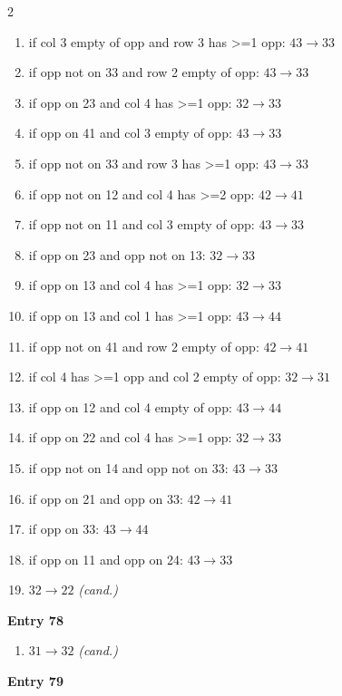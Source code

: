 \begin{multicols}{2}
\begin{tikzpicture}[scale=0.24]
\end{tikzpicture}
\nopagebreak\begin{enumerate}[topsep=1pt,itemsep=0pt,parsep=0pt,leftmargin=2.2em,label=\arabic*.]
\item if col 3 empty of opp and row 3 has >=1 opp: $43\!\to\!33$
\item if opp not on 33 and row 2 empty of opp: $43\!\to\!33$
\item if opp on 23 and col 4 has >=1 opp: $32\!\to\!33$
\item if opp on 41 and col 3 empty of opp: $43\!\to\!33$
\item if opp not on 33 and row 3 has >=1 opp: $43\!\to\!33$
\item if opp not on 12 and col 4 has >=2 opp: $42\!\to\!41$
\item if opp not on 11 and col 3 empty of opp: $43\!\to\!33$
\item if opp on 23 and opp not on 13: $32\!\to\!33$
\item if opp on 13 and col 4 has >=1 opp: $32\!\to\!33$
\item if opp on 13 and col 1 has >=1 opp: $43\!\to\!44$
\item if opp not on 41 and row 2 empty of opp: $42\!\to\!41$
\item if col 4 has >=1 opp and col 2 empty of opp: $32\!\to\!31$
\item if opp on 12 and col 4 empty of opp: $43\!\to\!44$
\item if opp on 22 and col 4 has >=1 opp: $32\!\to\!33$
\item if opp not on 14 and opp not on 33: $43\!\to\!33$
\item if opp on 21 and opp on 33: $42\!\to\!41$
\item if opp on 33: $43\!\to\!44$
\item if opp on 11 and opp on 24: $43\!\to\!33$
\item $32\!\to\!22$ \hfill\textit{(cand.)}
\end{enumerate}\smallskip
\noindent\textbf{Entry 78} \; 
\nopagebreak\begin{enumerate}[topsep=1pt,itemsep=0pt,parsep=0pt,leftmargin=2.2em,label=\arabic*.]
\item $31\!\to\!32$ \hfill\textit{(cand.)}
\end{enumerate}\smallskip
\noindent\textbf{Entry 79} \; 
\end{multicols}
